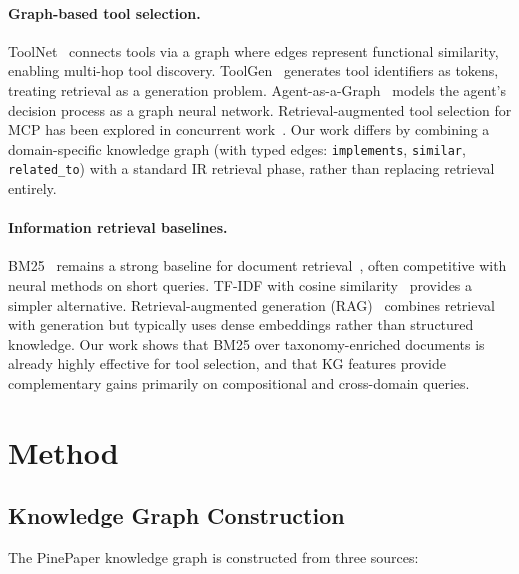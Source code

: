 \documentclass[11pt,a4paper]{article}
\begin{document}
\paragraph{Graph-based tool selection.}
ToolNet~\citep{qu2024toolnet} connects tools via a graph where edges represent functional similarity, enabling multi-hop tool discovery. ToolGen~\citep{yang2024toolgen} generates tool identifiers as tokens, treating retrieval as a generation problem. Agent-as-a-Graph~\citep{chen2024agentgraph} models the agent's decision process as a graph neural network. Retrieval-augmented tool selection for MCP has been explored in concurrent work~\citep{xu2024ragmcp}. Our work differs by combining a domain-specific knowledge graph (with typed edges: \texttt{implements}, \texttt{similar}, \texttt{related\_to}) with a standard IR retrieval phase, rather than replacing retrieval entirely.

\paragraph{Information retrieval baselines.}
BM25~\citep{robertson2009bm25} remains a strong baseline for document retrieval~\citep{manning2008ir}, often competitive with neural methods on short queries. TF-IDF with cosine similarity~\citep{salton1988tfidf} provides a simpler alternative. Retrieval-augmented generation (RAG)~\citep{lewis2020rag} combines retrieval with generation but typically uses dense embeddings rather than structured knowledge. Our work shows that BM25 over taxonomy-enriched documents is already highly effective for tool selection, and that KG features provide complementary gains primarily on compositional and cross-domain queries.

\section{Method}
\label{sec:method}

\subsection{Knowledge Graph Construction}

The PinePaper knowledge graph is constructed from three sources:
\end{document}
